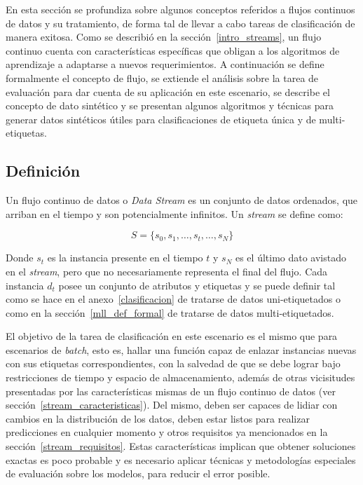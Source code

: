 En esta sección se profundiza sobre algunos conceptos referidos a flujos
continuos de datos y su tratamiento, de forma tal de llevar a cabo tareas de
clasificación de manera exitosa.  Como se describió en la
sección~\ref{intro_streams}, un flujo continuo cuenta con características
específicas que obligan a los algoritmos de aprendizaje a adaptarse a nuevos
requerimientos.  A continuación se define formalmente el concepto de flujo, se
extiende el análisis sobre la tarea de evaluación para dar cuenta de su
aplicación en este escenario, se describe el concepto de dato sintético y se
presentan algunos algoritmos y técnicas para generar datos sintéticos útiles
para clasificaciones de etiqueta única y de multi-etiquetas.

\subsection{Definición}

Un flujo continuo de datos o \textit{Data Stream} es un conjunto de datos
ordenados, que arriban en el tiempo y son potencialmente infinitos. Un
\textit{stream} se define como:

\begin{equation}
	S = \{s_{0}, s_{1}, \dots, s_{t}, \dots, s_{N}\}
\end{equation}

Donde $s_{t}$ es la instancia presente en el tiempo $t$ y $s_{N}$ es el último
dato avistado en el \textit{stream}, pero que no necesariamente representa el
final del flujo. Cada instancia $d_{t}$ posee un conjunto de atributos y
etiquetas y se puede definir tal como se hace en el anexo~\ref{clasificacion} de
tratarse de datos uni-etiquetados o como en la sección~\ref{mll_def_formal} de
tratarse de datos multi-etiquetados.

El objetivo de la tarea de clasificación en este escenario es el mismo que para
escenarios de \textit{batch}, esto es, hallar una función capaz de enlazar
instancias nuevas con sus etiquetas correspondientes, con la salvedad de que se
debe lograr bajo restricciones de tiempo y espacio de almacenamiento, además de
otras vicisitudes presentadas por las características mismas de un flujo
continuo de datos (ver sección~\ref{stream_caracteristicas}). Del mismo, deben
ser capaces de lidiar con cambios en la distribución de los datos, deben estar
listos para realizar predicciones en cualquier momento y otros requisitos ya
mencionados en la sección~\ref{stream_requisitos}. Estas características
implican que obtener soluciones exactas es poco probable y es necesario aplicar
técnicas y metodologías especiales de evaluación sobre los modelos, para reducir
el error posible.

